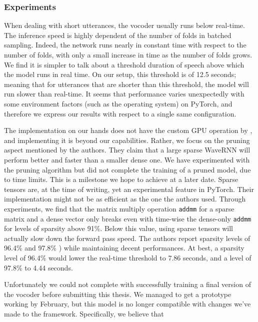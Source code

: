 \documentclass[a4paper, oneside, 12pt, english]{article}
\begin{document}
\subsubsection{Experiments} \label{vocoder_experiments}
When dealing with short utterances, the vocoder usually runs below real-time. The inference speed is highly dependent of the number of folds in batched sampling. Indeed, the network runs nearly in constant time with respect to the number of folds, with only a small increase in time as the number of folds grows. We find it is simpler to talk about a threshold duration of speech above which the model runs in real time. On our setup, this threshold is of 12.5 seconds; meaning that for utterances that are shorter than this threshold, the model will run slower than real-time. It seems that performance varies unexpectedly with some environment factors (such as the operating system) on PyTorch, and therefore we express our results with respect to a single same configuration.

The implementation on our hands does not have the custom GPU operation by \citep{WaveRNN}, and implementing it is beyond our capabilities. Rather, we focus on the pruning aspect mentioned by the authors. They claim that a large sparse WaveRNN will perform better and faster than a smaller dense one. We have experimented with the pruning algorithm but did not complete the training of a pruned model, due to time limits. This is a milestone we hope to achieve at a later date. Sparse tensors are, at the time of writing, yet an experimental feature in PyTorch. Their implementation might not be as efficient as the one the authors used. Through experiments, we find that the matrix multiply operation \texttt{addmm} for a sparse matrix and a dense vector only breaks even with time-wise the dense-only \texttt{addmm} for levels of sparsity above 91\%. Below this value, using sparse tensors will actually slow down the forward pass speed. The authors report sparsity levels of 96.4\% and 97.8\% \citep[Table 5]{WaveRNN}) while maintaining decent performances. At best, a sparsity level of 96.4\% would lower the real-time threshold to 7.86 seconds, and a level of 97.8\% to 4.44 seconds.



Unfortunately we could not complete with successfully training a final version of the vocoder before submitting this thesis. We managed to get a prototype working by February, but this model is no longer compatible with changes we've made to the framework. Specifically, we believe that 
\end{document}
